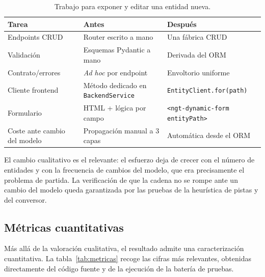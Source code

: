 \begin{table}[!htbp]
\caption{Trabajo para exponer y editar una entidad nueva.}
\label{tab:antesdespues}
\centering
\begin{tabular}{|p{4.4cm}|p{4.4cm}|p{4.4cm}|}
\hline
\textbf{Tarea} & \textbf{Antes} & \textbf{Después} \\ \hline
Endpoints CRUD & Router escrito a mano & Una fábrica CRUD \\ \hline
Validación & Esquemas Pydantic a mano & Derivada del ORM \\ \hline
Contrato/errores & \emph{Ad hoc} por endpoint & Envoltorio uniforme \\ \hline
Cliente frontend & Método dedicado en \texttt{BackendService} &
\texttt{EntityClient.for(path)} \\ \hline
Formulario & HTML + lógica por campo & \texttt{<ngt-dynamic-form
entityPath>} \\ \hline
Coste ante cambio del modelo & Propagación manual a 3 capas & Automática
desde el ORM \\ \hline
\end{tabular}
\end{table}

El cambio cualitativo es el relevante: el esfuerzo deja de crecer con el
número de entidades y con la frecuencia de cambios del modelo, que era
precisamente el problema de partida. La verificación de que la cadena no se
rompe ante un cambio del modelo queda garantizada por las pruebas de la
heurística de pistas y del conversor.

\subsection{Métricas cuantitativas}
Más allá de la valoración cualitativa, el resultado admite una caracterización
cuantitativa. La tabla~\ref{tab:metricas} recoge las cifras más relevantes,
obtenidas directamente del código fuente y de la ejecución de la batería de
pruebas.

